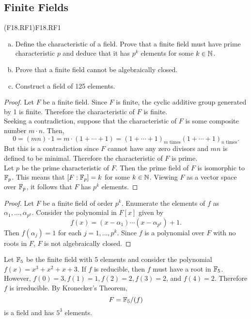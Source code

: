 \documentclass[../AlgebraQualSolutions.tex]{subfiles}
\begin{document}
\subsection{Finite Fields}

\begin{prob}{(F18.RF1)}{F18.RF1}
	\begin{enumerate}[(a)]
		\item Define the characteristic of a field. Prove that a finite field must have prime characteristic $p$ and deduce that it has $p^k$ elements for some $k \in \mathbb{N}$.
		\item Prove  that a finite field cannot be algebraically closed.
		\item Construct a field of 125 elements.
	\end{enumerate}
\end{prob}

\begin{proof}
	Let $F$ be a finite field. Since $F$ is finite, the cyclic additive  group generated by 1 is finite. Therefore the characteristic of $F$ is finite.\\
	
	Seeking a contradiction, suppose that the characteristic of $F$ is some composite number $m\cdot n$. Then,
		\[0 = (mn)\cdot 1 = m\cdot (1 + \cdots + 1) = (1 + \cdots + 1)_{\textrm{$m$ times}} (1 + \cdots + 1)_{\textrm{$n$ times}}.\]
	But this is a contradiction since $F$ cannot have any zero divisors and $mn$ is defined to be minimal. Therefore the characteristic of $F$ is prime.\\

	Let $p$ be the prime characteristic of $F$. Then the prime field of $F$ is isomorphic to $\mathbb{F}_p$. This means that $[F: \mathbb{F}_p] = k$ for some $k \in \mathbb{N}$. Viewing $F$ as a vector space over $\mathbb{F}_p$, it follows that $F$ has $p^k$ elements.
\end{proof}

\begin{proof}
	Let $F$ be a  finite field of order $p^k$. Enumerate the elements of $f$ as $\alpha_1,\ldots, \alpha_{p^k}$. Consider the polynomial in $F[x]$ given by 
		\[f(x) = (x-\alpha_1)\cdots (x-\alpha_{p^k}) + 1.\]
	Then $f(\alpha_j) = 1$ for each $j = 1,\ldots,p^k$. Since $f$ is a polynomial over $F$ with no roots in $F$, $F$ is not algebraically closed.
\end{proof}

\begin{solution}
	Let $\mathbb{F}_5$ be the finite field with 5 elements and consider the polynomial $f(x) = x^3 + x^2 + x + 3$. If $f$ is reducible, then $f$ must have a root in $\mathbb{F}_5$. However, $f(0) = 3, f(1) = 1, f(2) = 2, f(3) = 2$, and $f(4) = 2$. Therefore $f$ is irreducible. By Kronecker's Theorem,
		\[F = \mathbb{F}_5/(f)\]
	is a field and has $5^3$ elements.
\end{solution}
\end{document}
